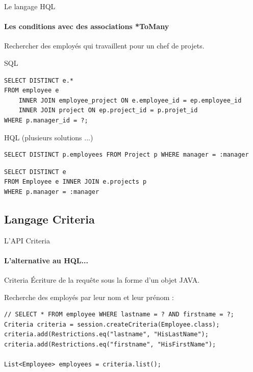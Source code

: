 \documentclass[compress]{beamer}%
\begin{document}
\begin{frame}[fragile]{Le langage HQL}
	\framesubtitle{Les conditions avec des associations *ToMany}
	
	\begin{block}{}
		\center
		Rechercher des employés qui travaillent pour un chef de projets.
	\end{block}
	
	\begin{exampleblock}{SQL}
	\begin{lstlisting}
SELECT DISTINCT e.*
FROM employee e
    INNER JOIN employee_project ON e.employee_id = ep.employee_id
    INNER JOIN project ON ep.project_id = p.projet_id
WHERE p.manager_id = ?;
	\end{lstlisting}
	\end{exampleblock}
	
	\pause
	\begin{exampleblock}{HQL (plusieurs solutions ...)}
	\begin{lstlisting}
SELECT DISTINCT p.employees FROM Project p WHERE manager = :manager
	\end{lstlisting}
	\pause
	\begin{lstlisting}
SELECT DISTINCT e
FROM Employee e INNER JOIN e.projects p
WHERE p.manager = :manager
	\end{lstlisting}
	\end{exampleblock}

\end{frame}


\subsection{Langage Criteria}

\begin{frame}[fragile]{L'API Criteria}
	\framesubtitle{L'alternative au HQL...}

	\begin{block}{Criteria}
		Écriture de la requête sous la forme d'un objet JAVA.
	\end{block}		
	
	\pause
	Recherche des employés par leur nom et leur prénom :
	\begin{lstlisting}
// SELECT * FROM employee WHERE lastname = ? AND firstname = ?;
Criteria criteria = session.createCriteria(Employee.class);
criteria.add(Restrictions.eq("lastname", "HisLastName");
criteria.add(Restrictions.eq("firstname", "HisFirstName");

List<Employee> employees = criteria.list();
	\end{lstlisting}

\end{frame}
	
\end{document}

